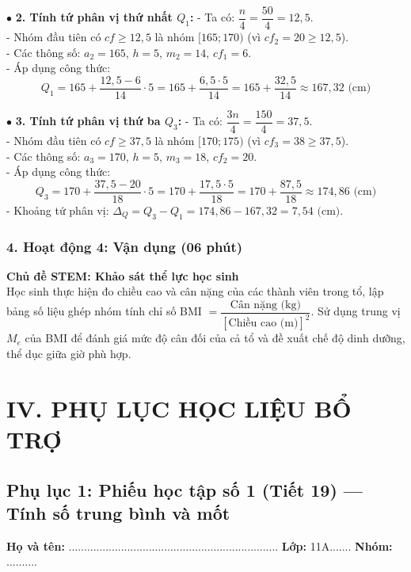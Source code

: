\documentclass[12pt, a4paper]{article}
\begin{document}
\begin{itemize}
    $\bullet$ \textbf{2. Tính tứ phân vị thứ nhất $Q_1$:}
    - Ta có: $\dfrac{n}{4} = \dfrac{50}{4} = 12{,}5$.\\
    - Nhóm đầu tiên có $cf \ge 12{,}5$ là nhóm $[165; 170)$ (vì $cf_2 = 20 \ge 12{,}5$).\\
    - Các thông số: $a_2 = 165$, $h = 5$, $m_2 = 14$, $cf_1 = 6$.\\
    - Áp dụng công thức:
    $$Q_1 = 165 + \dfrac{12{,}5 - 6}{14} \cdot 5 = 165 + \dfrac{6{,}5 \cdot 5}{14} = 165 + \dfrac{32{,}5}{14} \approx 167{,}32\text{ (cm)}$$

    $\bullet$ \textbf{3. Tính tứ phân vị thứ ba $Q_3$:}
    - Ta có: $\dfrac{3n}{4} = \dfrac{150}{4} = 37{,}5$.\\
    - Nhóm đầu tiên có $cf \ge 37{,}5$ là nhóm $[170; 175)$ (vì $cf_3 = 38 \ge 37{,}5$).\\
    - Các thông số: $a_3 = 170$, $h = 5$, $m_3 = 18$, $cf_2 = 20$.\\
    - Áp dụng công thức:
    $$Q_3 = 170 + \dfrac{37{,}5 - 20}{18} \cdot 5 = 170 + \dfrac{17{,}5 \cdot 5}{18} = 170 + \dfrac{87{,}5}{18} \approx 174{,}86\text{ (cm)}$$
    - Khoảng tứ phân vị: $\Delta_Q = Q_3 - Q_1 = 174{,}86 - 167{,}32 = 7{,}54\text{ (cm)}$.
\end{itemize}

\subsubsection*{4. Hoạt động 4: Vận dụng (06 phút)}
\textbf{Chủ đề STEM: Khảo sát thể lực học sinh}\\
Học sinh thực hiện đo chiều cao và cân nặng của các thành viên trong tổ, lập bảng số liệu ghép nhóm tính chỉ số BMI $= \dfrac{\text{Cân nặng (kg)}}{[\text{Chiều cao (m)}]^2}$. Sử dụng trung vị $M_e$ của BMI để đánh giá mức độ cân đối của cả tổ và đề xuất chế độ dinh dưỡng, thể dục giữa giờ phù hợp.

\newpage

\section*{IV. PHỤ LỤC HỌC LIỆU BỔ TRỢ}

\subsection*{Phụ lục 1: Phiếu học tập số 1 (Tiết 19) --- Tính số trung bình và mốt}
\noindent\textbf{Họ và tên:} .................................................................... \textbf{Lớp:} 11A....... \textbf{Nhóm:} ..........
\end{document}
